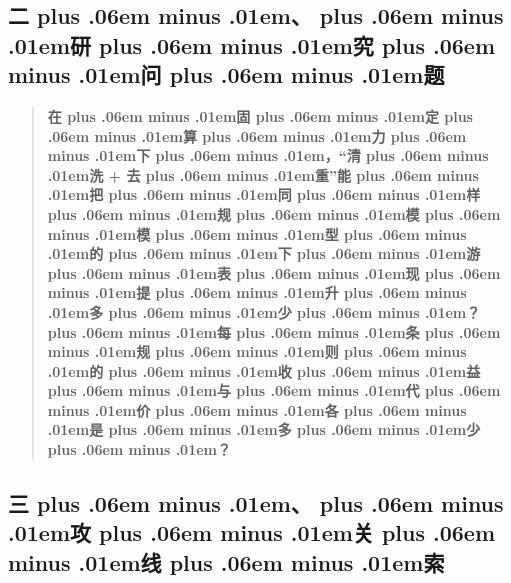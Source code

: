 \documentclass[
]{article}
\def\zh#1{{\zhfont #1}}
\def\zhglue{\hskip0pt plus .06em minus .01em}
\begin{document}
\subsection{\zh{二\zhglue 、\zhglue 研\zhglue 究\zhglue 问\zhglue 题}}\label{ux4e8cux7814ux7a76ux95eeux9898-1}

\begin{quote}
\textbf{\zh{在\zhglue 固\zhglue 定\zhglue 算\zhglue 力\zhglue 下\zhglue ，}``\zh{清\zhglue 洗} + \zh{去\zhglue 重}''\zh{能\zhglue 把\zhglue 同\zhglue 样\zhglue 规\zhglue 模\zhglue 模\zhglue 型\zhglue 的\zhglue 下\zhglue 游\zhglue 表\zhglue 现\zhglue 提\zhglue 升\zhglue 多\zhglue 少\zhglue ？\zhglue 每\zhglue 条\zhglue 规\zhglue 则\zhglue 的\zhglue 收\zhglue 益\zhglue 与\zhglue 代\zhglue 价\zhglue 各\zhglue 是\zhglue 多\zhglue 少\zhglue ？}}
\end{quote}

\subsection{\zh{三\zhglue 、\zhglue 攻\zhglue 关\zhglue 线\zhglue 索}}\label{ux4e09ux653bux5173ux7ebfux7d22-5}
\end{document}
